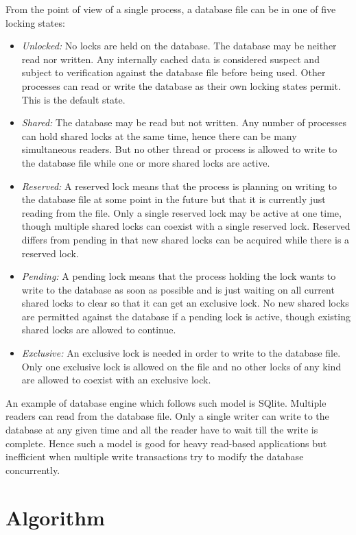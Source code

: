 \documentclass[11pt,a4paper]{article}
\begin{document}
From the point of view of a single process, a database file can be in one of five locking states:
\begin{itemize}
\item \emph{Unlocked:} No locks are held on the database. The database may be neither read nor written. Any internally cached data is considered suspect and subject to verification against the database file before being used. Other processes can read or write the database as their own locking states permit. This is the default state.
\item \emph{Shared:} The database may be read but not written. Any number of processes can hold shared locks at the same time, hence there can be many simultaneous readers. But no other thread or process is allowed to write to the database file while one or more shared locks are active.
\item \emph{Reserved:}  A reserved lock means that the process is planning on writing to the database file at some point in the future but that it is currently just reading from the file. Only a single reserved lock may be active at one time, though multiple shared locks can coexist with a single reserved lock. Reserved differs from pending in that new shared locks can be acquired while there is a reserved lock.
\item \emph{Pending:}  A pending lock means that the process holding the lock wants to write to the database as soon as possible and is just waiting on all current shared locks to clear so that it can get an exclusive lock. No new shared locks are permitted against the database if a pending lock is active, though existing shared locks are allowed to continue.
\item \emph{Exclusive:} An exclusive lock is needed in order to write to the database file. Only one exclusive lock is allowed on the file and no other locks of any kind are allowed to coexist with an exclusive lock.
\end{itemize}

An example of database engine which follows such model is SQlite.
Multiple readers can read from the database file. 
Only a single writer can write to the database at any given time and all the reader have to wait till the write is complete.
Hence such a model is good for heavy read-based applications but inefficient when multiple write transactions try to modify the database concurrently.

\pagebreak

\section{Algorithm}
\end{document}

